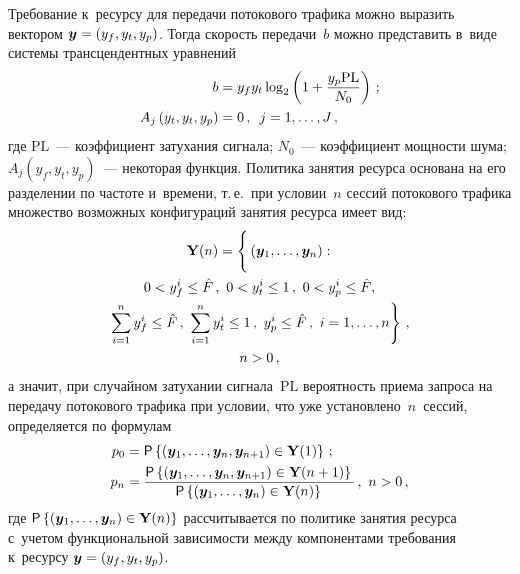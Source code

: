 \begin{multicols}{2}
  Требование к~ресурсу для передачи потокового трафика можно выразить 
вектором $\bm{y}\hm= (y_f, y_t, y_p)$. Тогда скорость передачи~$b$ можно 
представить в~виде системы трансцендентных уравнений
  \begin{align*}
  b&= y_f y_t \log_2\left( 1+\displaystyle\frac{\displaystyle y_p\mathrm{PL}\mathstrut}{\displaystyle N_0\mathstrut}\right)\,;\\
  A_j\left( y_t, y_t, y_p\right) &=0\,,\enskip j=1,\ldots , J\,,
  \end{align*}
где $\mathrm{PL}$~--- коэффициент затухания сигнала; $N_0$~--- коэффициент 
мощности шума; $A_j(y_f, y_t, y_p)$~--- некоторая функция. Политика 
занятия ресурса основана на его разделении по частоте и~времени, т.\,е.\ при 
условии~$n$ сессий потокового трафика множество возможных конфигураций 
занятия ресурса имеет вид: 
\begin{multline*}
\mathbf{Y}(n)= \left\{
\vphantom{\sum\limits^n_{i=1}}
 \left( \bm{y}_1, \ldots, \bm{y}_n\right):\right.\\
0<y_f^i\leq \hat{F}\,,\ 0<y_t^i\leq 1\,,\ 0< y_p^i\leq \hat{F},\\
\left. \sum\limits_{i=1}^n y_f^i\leq \hat{F}\,,\ \sum\limits^n_{i=1} y_t^i\leq 1\,,\ 
y_p^i\leq \hat{F}\,,\ i=1,\ldots , n\right\}\,,\\
 n>0\,,
\end{multline*}
а значит, при случайном затухании сигнала~$\mathrm{PL}$  вероятность приема запроса на 
передачу потокового трафика при условии, что уже установлено~$n$~сессий, 
определяется по формулам
\begin{align*}
p_0&= {\sf P} \left\{ \left( \bm{y}_1, \ldots , \bm{y}_n, \bm{y}_{n+1}\right) \in 
\mathbf{Y}(1)\right\}\,;\\
p_n&= \displaystyle\frac{\displaystyle {\sf P} \left\{ \left( \bm{y}_1, \ldots , \bm{y}_n, \bm{y}_{n+1}\right) 
\in \mathbf{Y}(n+1)\right\}\mathstrut}{\displaystyle {\sf P} \left\{ \left( \bm{y}_1,\ldots , \bm{y}_n\right) 
\in \mathbf{Y}(n)\right\}\mathstrut}\,,\ n>0\,,
\end{align*}
где ${\sf P} \left\{ \left( \bm{y}_1,\ldots , \bm{y}_n\right) \in 
\mathbf{Y}(n)\right\}$ рассчитывается по политике занятия ресурса с~учетом 
функциональной зависимости между компонентами требования к~ресурсу 
$\bm{y}\hm= \left( y_f, y_t, y_p\right)$.


\end{multicols}
